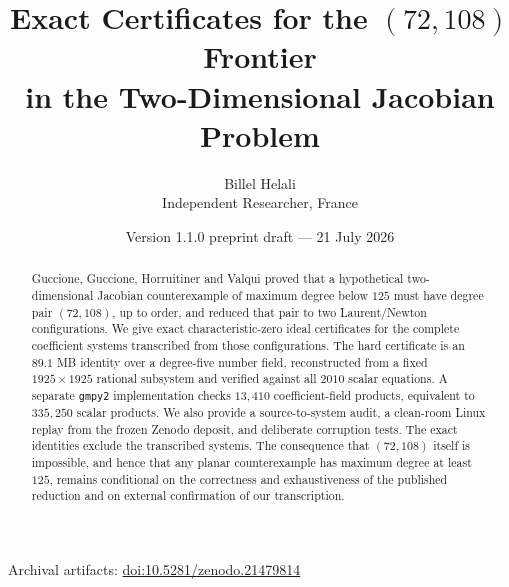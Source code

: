 \documentclass[11pt,a4paper]{article}
\title{\textbf{Exact Certificates for the $(72,108)$ Frontier\\in the Two-Dimensional Jacobian Problem}}
\author{Billel Helali\\\small Independent Researcher, France}
\date{Version 1.1.0 preprint draft --- 21 July 2026}
\theoremstyle{remark}
\begin{document}
\maketitle

\begin{center}
\small Archival artifacts: \href{https://doi.org/10.5281/zenodo.21479814}{doi:10.5281/zenodo.21479814}
\end{center}

\begin{center}
\end{center}

\begin{abstract}
Guccione, Guccione, Horruitiner and Valqui proved that a hypothetical two-dimensional Jacobian counterexample of maximum degree below $125$ must have degree pair $(72,108)$, up to order, and reduced that pair to two Laurent/Newton configurations. We give exact characteristic-zero ideal certificates for the complete coefficient systems transcribed from those configurations. The hard certificate is an $89.1$ MB identity over a degree-five number field, reconstructed from a fixed $1925\times1925$ rational subsystem and verified against all $2010$ scalar equations. A separate \texttt{gmpy2} implementation checks $13{,}410$ coefficient-field products, equivalent to $335{,}250$ scalar products. We also provide a source-to-system audit, a clean-room Linux replay from the frozen Zenodo deposit, and deliberate corruption tests. The exact identities exclude the transcribed systems. The consequence that $(72,108)$ itself is impossible, and hence that any planar counterexample has maximum degree at least $125$, remains conditional on the correctness and exhaustiveness of the published reduction and on external confirmation of our transcription.
\end{abstract}
\end{document}
